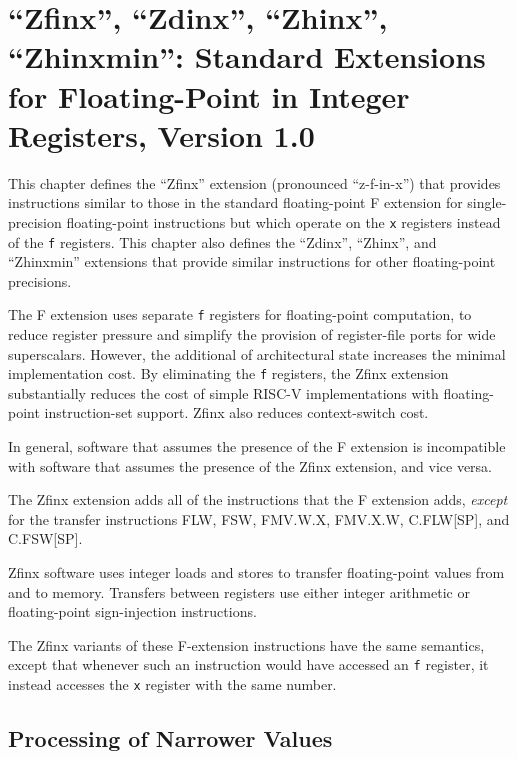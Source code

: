 \chapter{``Zfinx'', ``Zdinx'', ``Zhinx'', ``Zhinxmin'': Standard Extensions for Floating-Point in Integer Registers, Version 1.0}
\label{sec:zfinx}

This chapter defines the ``Zfinx'' extension (pronounced ``z-f-in-x'')
that provides instructions similar to those in the standard
floating-point F extension for single-precision floating-point
instructions but which operate on the {\tt x} registers instead of the
{\tt f} registers.  This chapter also defines the ``Zdinx'',
``Zhinx'', and ``Zhinxmin'' extensions that provide similar
instructions for other floating-point precisions.

\begin{commentary}
The F extension uses separate {\tt f} registers for floating-point
computation, to reduce register pressure and simplify the provision of
register-file ports for wide superscalars.
However, the additional  of architectural state increases the
minimal implementation cost.
By eliminating the {\tt f} registers, the Zfinx extension substantially
reduces the cost of simple RISC-V implementations with floating-point
instruction-set support.
Zfinx also reduces context-switch cost.

In general, software that assumes the presence of the F extension
is incompatible with software that assumes the presence of the Zfinx
extension, and vice versa.
\end{commentary}

The Zfinx extension adds all of the instructions that the F extension
adds, {\em except} for the transfer instructions FLW, FSW, FMV.W.X,
FMV.X.W, C.FLW[SP], and C.FSW[SP].

\begin{commentary}
Zfinx software uses integer loads and stores to transfer floating-point values
from and to memory.
Transfers between registers use either integer arithmetic or floating-point
sign-injection instructions.
\end{commentary}

The Zfinx variants of these F-extension instructions have the same semantics,
except that whenever such an instruction would have accessed an {\tt f}
register, it instead accesses the {\tt x} register with the same number.

\section{Processing of Narrower Values}

